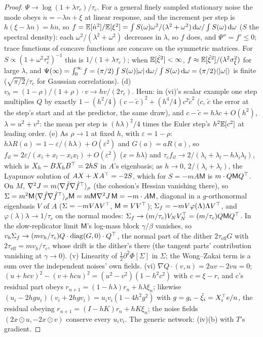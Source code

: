 \begin{proof}
$\Psi\to\log(1 + \lambda\tau_c)/\tau_c$. For a general finely sampled stationary noise the mode obeys
$\dot n = -\lambda n + \xi$ at linear response, and the increment per step is $h(\xi - \lambda n) = h\dot n$, so
$f = \mathbb{E}[\dot n^2]/\mathbb{E}[\xi^2] = \int S(\omega)\omega^2/(\lambda^2 + \omega^2)\,\mathrm{d}\omega/\int S(\omega)\,\mathrm{d}\omega$ ($S$ the
spectral density): each $\omega^2/(\lambda^2 + \omega^2)$ decreases in $\lambda$, so $f$ does, and
$\Psi'' = f'\le0$; trace functions of concave functions are concave on the symmetric matrices. For
$S\propto(1 + \omega^2\tau_c^2)^{-1}$ this is $1/(1 + \lambda\tau_c)$; when $\mathbb{E}[\dot\xi^2] < \infty$,
$f\approx\mathbb{E}[\dot\xi^2]/(\lambda^2\sigma_\xi^2)$ for large $\lambda$, and
$\Psi(\infty) = \int_0^\infty f = (\pi/2)\int S(\omega)\lvert \omega\rvert\,\mathrm{d}\omega/\int S(\omega)\,\mathrm{d}\omega
= (\pi/2)\langle\lvert \omega\rvert\rangle$ is finite ($\sqrt{\pi/2}/\tau_c$ for Gaussian correlations). (d)
$v_h = (1 - \rho)/(1 + \rho)\cdot v\to hv/(2\tau_c)$. Heun: in (vi)'s scalar example one step multiplies $Q$ by exactly
$1 - (h^2/4)(c - \tilde c)^2 + (h^4/4)c^2\tilde c^2$ ($c$, $\tilde c$ the error at the step's start and at the
predictor, the same draw), and $c - \tilde c = h\lambda c + O(h^2)$, $\lambda = u^2 + v^2$: the mean per step is
$(h\lambda)^2/4$ times the Euler step's $h^2\mathbb{E}[c^2]$ at leading order. (e) As $\rho\to1$ at fixed $h$, with
$\varepsilon = 1 - \rho$: $h\lambda R(a) = 1 - \varepsilon/(h\lambda) + O(\varepsilon^2)$ and $G(a) = aR(a)$, so
$f_{il} = 2\varepsilon/(x_i + x_l - x_ix_l) + O(\varepsilon^2)$ ($x = h\lambda$) and
$\tau_cf_{il}\to2/(\lambda_i + \lambda_l - h\lambda_i\lambda_l)$, which is $X_h - BX_hB^\top = 2hS$ in $A$'s eigenbasis;
as $h\to0$, $2/(\lambda_i + \lambda_l)$, the Lyapunov solution of $AX + XA^\top = -2S$, which for $S = -mA\mathsf M$ is
$m\cdot Q\mathsf MQ^\top$. On $M$, $\nabla^2J = m\langle\nabla\hat f\nabla\hat f^\top\rangle_\rho$ (the cohesion's Hessian
vanishing there), so
$\Sigma = m^2\mathsf M\langle\nabla\hat f\nabla\hat f^\top\rangle_\rho\mathsf M = m\mathsf M\nabla^2J\,\mathsf M
= -m\cdot A\mathsf M$, diagonal in a $g$-orthonormal eigenbasis $V$ of $A$ ($\Sigma = -mV\Lambda V^\top$,
$\mathsf M = VV^\top$); $\Sigma_f = -mV\varphi(\Lambda)\Lambda V^\top$, and $\varphi(\lambda)\lambda\to1/\tau_c$ on the normal
modes: $\Sigma_f\to(m/\tau_c)V_NV_N^\top = (m/\tau_c)Q\mathsf MQ^\top$. In the slow-replicator limit $\mathsf M$'s
log-mass block $\gamma/\beta$ vanishes, so
$v_h\Sigma_f\to(mv_h/\tau_c)Q\cdot\operatorname{diag}(G,0)\cdot Q^\top$, the normal part of the dither
$2\tau_{\mathrm{eff}}G$ with $2\tau_{\mathrm{eff}} = mv_h/\tau_c$, whose drift is the dither's there (the tangent parts'
contribution vanishing at $\gamma\to0$). (v) Linearity of $\tfrac12\partial^2\Phi[\Sigma]$ in $\Sigma$; the Wong--Zakai
term is a sum over the independent noises' own fields. (vi) $\nabla Q\cdot(v,u) = 2uv - 2vu = 0$;
$(u + hcv)^2 - (v + hcu)^2 = (u^2 - v^2)(1 - h^2c^2)$ with $c = \xi - r$, and $c$'s residual part obeys
$r_{n+1} = (1 - h\lambda)r_n + h\lambda\xi_n$; likewise $(u_i - 2hgu_i)(v_i + 2hgv_i) = u_iv_i(1 - 4h^2g^2)$ with
$g = g_i - \tilde\xi_i = X_i^\top e/n$, the residual obeying $r_{n+1} = (I - hK)r_n + hK\xi_n$; the noise fields
$(2x\odot u,-2x\odot v)$ conserve every $u_iv_i$. The generic network: (iv)(b) with $T$'s gradient.
\end{proof}

